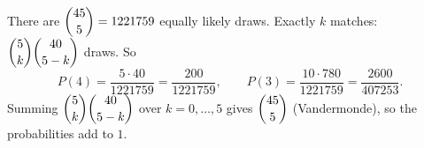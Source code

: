 There are $\dbinom{45}5=1221759$ equally likely draws. Exactly $k$ matches: $\dbinom5k\dbinom{40}{5-k}$ draws. So
\[P(4)=\dfrac{5\cdot40}{1221759}=\boxed{\dfrac{200}{1221759}},\qquad P(3)=\dfrac{10\cdot780}{1221759}=\boxed{\dfrac{2600}{407253}}.\]
Summing $\dbinom5k\dbinom{40}{5-k}$ over $k=0,\dots,5$ gives $\dbinom{45}5$ (Vandermonde), so the probabilities add to $1$.
